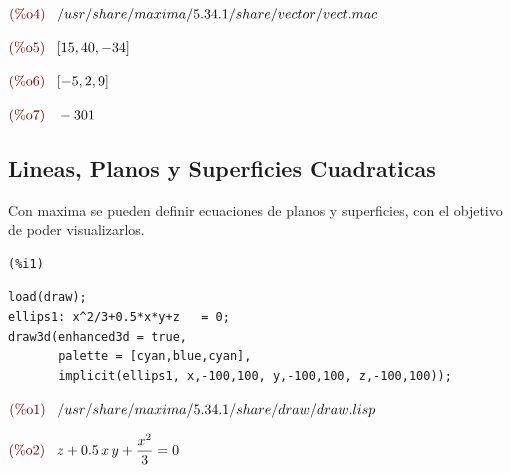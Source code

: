 \documentclass[12pt]{article}
\begin{document}
\begin{math}\displaystyle
\parbox{8ex}{\color{labelcolor}(\%o4) }
/usr/share/maxima/5.34.1/share/vector/vect.mac
\end{math}

\begin{math}\displaystyle
\parbox{8ex}{\color{labelcolor}(\%o5) }
[15,40,-34]
\end{math}

\begin{math}\displaystyle
\parbox{8ex}{\color{labelcolor}(\%o6) }
[-5,2,9]
\end{math}

\begin{math}\displaystyle
\parbox{8ex}{\color{labelcolor}(\%o7) }
-301
\end{math}

\subsection{Lineas, Planos y Superficies Cuadraticas}
Con maxima se pueden definir ecuaciones de planos y superficies, con el objetivo de poder visualizarlos.
\begin{minipage}[t]{8ex}{\color{red}\bf
\begin{verbatim}
(%i1) 
\end{verbatim}}
\end{minipage}
\begin{minipage}[t]{\textwidth}{\color{blue}
\begin{verbatim}
load(draw);
ellips1: x^2/3+0.5*x*y+z   = 0;
draw3d(enhanced3d = true,
       palette = [cyan,blue,cyan],
       implicit(ellips1, x,-100,100, y,-100,100, z,-100,100));
\end{verbatim}}
\end{minipage}

\begin{math}\displaystyle
\parbox{8ex}{\color{labelcolor}(\%o1) }
/usr/share/maxima/5.34.1/share/draw/draw.lisp
\end{math}

\begin{math}\displaystyle
\parbox{8ex}{\color{labelcolor}(\%o2) }
z+0.5\,x\,y+\frac{{x}^{2}}{3}=0
\end{math}
\end{document}

